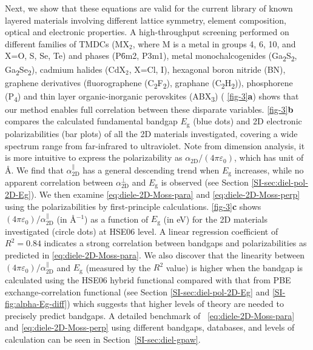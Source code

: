 Next, we show that these equations are valid for the current
library of known layered materials involving different lattice
symmetry, element composition, optical and electronic properties.
%
A high-throughput screening performed on different families of TMDCs
(MX\(_{\text{2}}\), where M is a metal in groups 4, 6, 10, and X=O, S,
Se, Te) and phases (P\={6}m2, P3m1), metal monochalcogenides
(Ga\textsubscript{2}S\textsubscript{2},
Ga\textsubscript{2}Se\textsubscript{2}), cadmium halides (CdX$_2$,
X=Cl, I), hexagonal boron nitride (BN), graphene derivatives
(fluorographene (C\textsubscript{2}F\textsubscript{2}), graphane
(C\textsubscript{2}H\textsubscript{2})), phosphorene
(P\textsubscript{4}) and thin layer organic-inorganic perovskites
(ABX\textsubscript{3}) ( \autoref{fig-3}{\textbf a}) shows that our
method enables full correlation between these disparate variables.
 \autoref{fig-3}{\textbf b} compares the calculated fundamental
bandgap $E_{\mathrm{g}}$ (blue dots) and 2D electronic
polarizabilities (bar plots) of all the 2D materials investigated,
covering a wide spectrum range from far-infrared to ultraviolet.  Note
from dimension analysis, it is more intuitive to express the
polarizability as $\alpha_{\mathrm{2D}}/(4 \pi \varepsilon_{0})$,
which has unit of \AA{}. We find that
$\alpha_{\mathrm{2D}}^{\parallel}$ has a general descending trend when
$E_{\mathrm{g}}$ increases, while no apparent correlation between
$\alpha_{\mathrm{2D}}^{\perp}$ and $E_{\mathrm{g}}$ is observed (see
 Section \autoref{SI-sec:diel-pol-2D-Eg}).  We then examine
 \autoref{eq:diele-2D-Moss-para} and \autoref{eq:diele-2D-Moss-perp} using the
polarizabilities by first-principle calculations.  
\autoref{fig-3}\textbf{c} shows
$(4 \pi \varepsilon_{0})/\alpha_{\mathrm{2D}}^{\parallel}$ (in
\AA{}$^{-1}$) as a function of $E_{\mathrm{g}}$ (in eV) for the 2D
materials investigated (circle dots) at HSE06 level.  A linear
regression coefficient of $R^{2}=0.84$ indicates a strong correlation
between bandgaps and polarizabilities as predicted in
 \autoref{eq:diele-2D-Moss-para}.  We also discover that the linearity
between $(4 \pi \varepsilon_{0})/\alpha_{\mathrm{2D}}^{\parallel}$ and
$E_{\mathrm{g}}$ (measured by the $R^{2}$ value) is higher when the
bandgap is calculated using the HSE06 hybrid functional compared with
that from PBE exchange-correlation functional (see 
Section \autoref{SI-sec:diel-pol-2D-Eg} and  
\autoref{SI-fig:alpha-Eg-diff}) which suggests that higher levels of
theory are needed to precisely predict bandgaps.  A detailed benchmark
of ~\autoref{eq:diele-2D-Moss-para} and \autoref{eq:diele-2D-Moss-perp} using
different bandgaps, databases, and levels of calculation can be seen
in  Section~\autoref{SI-sec:diel-gpaw}.



